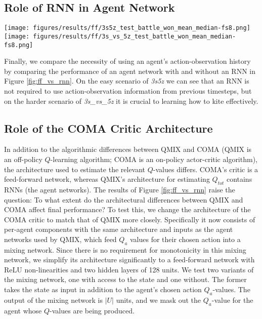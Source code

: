 \documentclass[twoside,11pt]{article}
\begin{document}
\subsection{Role of RNN in Agent Network}

\begin{figure*}[h!]
    \centering
    \texttt{[image: figures/results/ff/3s5z\_test\_battle\_won\_mean\_median-fs8.png]}
    \texttt{[image: figures/results/ff/3s\_vs\_5z\_test\_battle\_won\_mean\_median-fs8.png]}
    \caption{Comparing agent networks with and without RNNs (QMIX-FF) on two scenarios.}
    \label{fig:ff_vs_rnn}
\end{figure*}

Finally, we compare the necessity of using an agent's action-observation history by comparing the performance of an agent network with and without an RNN in Figure \ref{fig:ff_vs_rnn}.
On the easy scenario of \textit{3s5z} we can see that an RNN is not required to use action-observation information from previous timesteps, but on the harder scenario of \textit{3s\_vs\_5z} it is crucial to learning how to kite effectively. 

\subsection{Role of the COMA Critic Architecture}

In addition to the algorithmic differences between QMIX and COMA (QMIX is an off-policy $Q$-learning algorithm; COMA is an on-policy actor-critic algorithm), the architecture used to estimate the relevant $Q$-values differs.
COMA's critic is a feed-forward network, whereas QMIX's architecture for estimating $Q_{tot}$ contains RNNs (the agent networks).
The results of Figure \ref{fig:ff_vs_rnn} raise the question: To what extent do the architectural differences between QMIX and COMA affect final performance?
To test this, we change the architecture of the COMA critic to match that of QMIX more closely.
Specifically it now consists of per-agent components with the same architecture and inputs as the agent networks used by QMIX, which feed  $Q_a$ values for their chosen action into a mixing network. 
Since there is no requirement for monotonicity in this mixing network, we simplify its architecture significantly to a feed-forward network with ReLU non-linearities and two hidden layers of 128 units.
We test two variants of the mixing network, one with access to the state and one without.
The former takes the state as input in addition to the agent's chosen action $Q_a$-values.
The output of the mixing network is $|U|$ units, and we mask out the $Q_a$-value for the agent whose $Q$-values are being produced.
\end{document}
